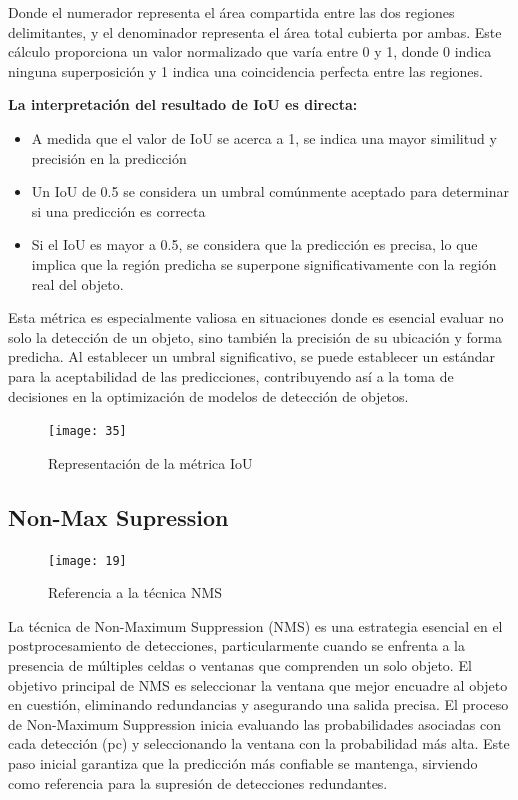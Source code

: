 	Donde el numerador representa el área compartida entre las dos regiones delimitantes, y el denominador representa el área total cubierta por ambas. Este cálculo proporciona un valor normalizado que varía entre 0 y 1, donde 0 indica ninguna superposición y 1 indica una coincidencia perfecta entre las regiones.
	
	\vspace{0.3cm}
	
	\textbf{La interpretación del resultado de IoU es directa:} 
	\begin{itemize}
	\item A medida que el valor de IoU se acerca a 1, se indica una mayor similitud y precisión en la predicción
	\item Un IoU de 0.5 se considera un umbral comúnmente aceptado para determinar si una predicción es correcta
	\item Si el IoU es mayor a 0.5, se considera que la predicción es precisa, lo que implica que la región predicha se superpone significativamente con la región real del objeto.
	
	\end{itemize}		

	Esta métrica es especialmente valiosa en situaciones donde es esencial evaluar no solo la detección de un objeto, sino también la precisión de su ubicación y forma predicha. Al establecer un umbral significativo, se puede establecer un estándar para la aceptabilidad de las predicciones, contribuyendo así a la toma de decisiones en la optimización de modelos de detección de objetos.

	\begin{figure}[ht]
	    \centering
		\texttt{[image: 35]}
		\caption{Representación de la métrica IoU}
	\end{figure}

	\subsection{Non-Max Supression}

	\begin{figure} 
		\centering
		\texttt{[image: 19]}
		\caption{Referencia a la técnica NMS}
	\end{figure}
	
	La técnica de Non-Maximum Suppression (NMS) es una estrategia esencial en el postprocesamiento de detecciones, particularmente cuando se enfrenta a la presencia de múltiples celdas o ventanas que comprenden un solo objeto. El objetivo principal de NMS es seleccionar la ventana que mejor encuadre al objeto en cuestión, eliminando redundancias y asegurando una salida precisa.
    El proceso de Non-Maximum Suppression inicia evaluando las probabilidades asociadas con cada detección (pc) y seleccionando la ventana con la probabilidad más alta. Este paso inicial garantiza que la predicción más confiable se mantenga, sirviendo como referencia para la supresión de detecciones redundantes.
	
